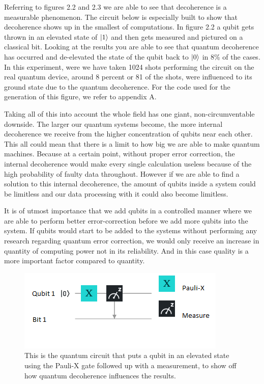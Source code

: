 Referring to figures 2.2 and 2.3 we are able to see that decoherence is a measurable phenomenon. The circuit below is especially built to show that decoherence shows up in the smallest of computations. In figure 2.2 a qubit gets thrown in an elevated state of $\ket{1}$ and then gets measured and pictured on a classical bit. Looking at the results you are able to see that quantum decoherence has occurred and de-elevated the state of the qubit back to $\ket{0}$ in 8\% of the cases. In this experiment, were we have taken 1024 shots performing the circuit on the real quantum device, around 8 percent or 81 of the shots, were influenced to its ground state due to the quantum decoherence. For the code used for the generation of this figure, we refer to appendix A. 

Taking all of this into account the whole field has one giant, non-circumventable downside. The larger our quantum systems become, the more internal decoherence we receive from the higher concentration of qubits near each other. This all could mean that there is a limit to how big we are able to make quantum machines. Because at a certain point, without proper error correction, the internal decoherence would make every single calculation useless because of the high probability of faulty data throughout. However if we are able to find a solution to this internal decoherence, the amount of qubits inside a system could be limitless and our data processing with it could also become limitless. \autocite{Hartnett2019}

It is of utmost importance that we add qubits in a controlled manner where we are able to perform better error-correction before we add more qubits into the system. If qubits would start to be added to the systems without performing any research regarding quantum error correction, we would only receive an increase in quantity of computing power not in its reliability. And in this case quality is a more important factor compared to quantity.

\begin{figure}[h]
	\centering
	\includegraphics[scale = 0.75]{../Demonstration/img/Quantum_decoherence_circuit.PNG}
	\caption{This is the quantum circuit that puts a qubit in an elevated state using the Pauli-X gate followed up with a measurement, to show off how quantum decoherence influences the results.}
\end{figure}

